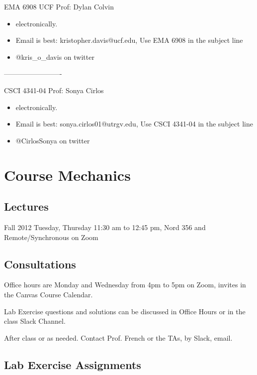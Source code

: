 \documentclass[10pt]{article} %
\begin{document}
  EMA 6908 UCF Prof: Dylan Colvin
    \begin{itemize}
      \item electronically.
      \item Email is best: kristopher.davis@ucf.edu, Use EMA 6908 in the subject line
      \item @kris\_o\_davis on twitter
    \end{itemize}

-------------------------

  CSCI 4341-04 Prof: Sonya Cirlos
\begin{itemize}
  \item electronically.
  \item Email is best: sonya.cirlos01@utrgv.edu, Use CSCI 4341-04 in the subject line
  \item @CirlosSonya on twitter
\end{itemize}


\section{Course Mechanics}

  \subsection{Lectures}

    Fall 2012 	Tuesday, Thursday 11:30 am to 12:45 pm, Nord 356 and Remote/Synchronous on Zoom

  \subsection{Consultations}

    Office hours are Monday and Wednesday from 4pm to 5pm on Zoom, invites in the Canvas Course Calendar.

    Lab Exercise questions and solutions can be discussed in Office Hours or in the class Slack Channel.

    After class or as needed. Contact Prof. French or the TAs, by Slack, email.

  \subsection{Lab Exercise Assignments}
\end{document}
